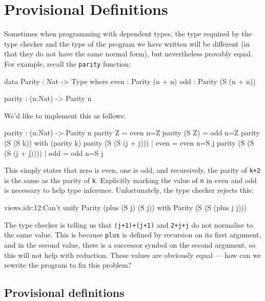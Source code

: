 \section{Provisional Definitions}

\label{sect:provisional}

Sometimes when programming with dependent types, the type required by the type
checker and the type of the program we have written will be different (in that
they do not have the same normal form), but nevertheless provably equal. For
example, recall the \texttt{parity} function:

\begin{code}
data Parity : Nat -> Type where
   even : Parity (n + n)
   odd  : Parity (S (n + n))

parity : (n:Nat) -> Parity n
\end{code}

\noindent
We'd like to implement this as follows:

\begin{code}
parity : (n:Nat) -> Parity n
parity Z     = even {n=Z}
parity (S Z) = odd {n=Z}
parity (S (S k)) with (parity k)
  parity (S (S (j + j)))     | even = even {n=S j}
  parity (S (S (S (j + j)))) | odd  = odd {n=S j}
\end{code}

\noindent
This simply states that zero is even, one is odd, and recursively, the parity
of \texttt{k+2} is the same as the parity of \texttt{k}. 
Explicitly marking the value of \texttt{n} in
even and odd is necessary to help type inference. Unfortunately, the type
checker rejects this:

\begin{code}
views.idr:12:Can't unify Parity (plus (S j) (S j)) with 
Parity (S (S (plus j j)))
\end{code}

\noindent
The type checker
is telling us that \texttt{(j+1)+(j+1)} and \texttt{2+j+j}
do not normalise to the same value.
This is because \texttt{plus} is defined by recursion on its first argument, and in the
second value, there is a successor symbol on the second argument, so this will
not help with reduction. These values are obviously equal --- how can we rewrite the program to fix this problem?

\subsection{Provisional definitions}

